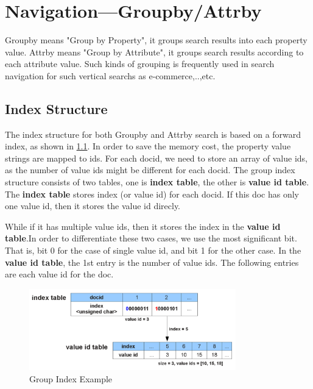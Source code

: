 \chapter{Navigation---Groupby/Attrby}

Groupby means "Group by Property", it groups search results into each property value. Attrby means "Group by Attribute", it groups search results according to each attribute value.
Such kinds of grouping is frequently used in search navigation for such vertical searchs as e-commerce,..,etc. 

\section{Index Structure}
\label{GroupIndex}

The index structure for both Groupby and Attrby search is based on a forward index, as shown in \ref{fig:group_index}. 
In order to save the memory cost, the property value strings are mapped to ids. For each docid, we need to store an array of value ids, as the number of value ids might be 
different for each docid. The group index structure consists of two tables, one is \textbf{index table}, the other is \textbf{value id table}.
The \textbf{index table} stores index (or value id) for each docid. If this doc has only one value id, then it stores the value id direcly.

While if it has multiple value ids, then it stores the index in the \textbf{value id table}.In order to differentiate these two cases, we use the most significant bit.
That is, bit 0 for the case of single value id, and bit 1 for the other case.  In the \textbf{value id table}, the 1st entry is the number of value ids.
The following entries are each value id for the doc.

\begin{figure}[htp]
\centering
\includegraphics[width=0.8\textwidth]{Figures/group_index.png}
\caption{Group Index Example}\label{fig:group_index}
\end{figure}

